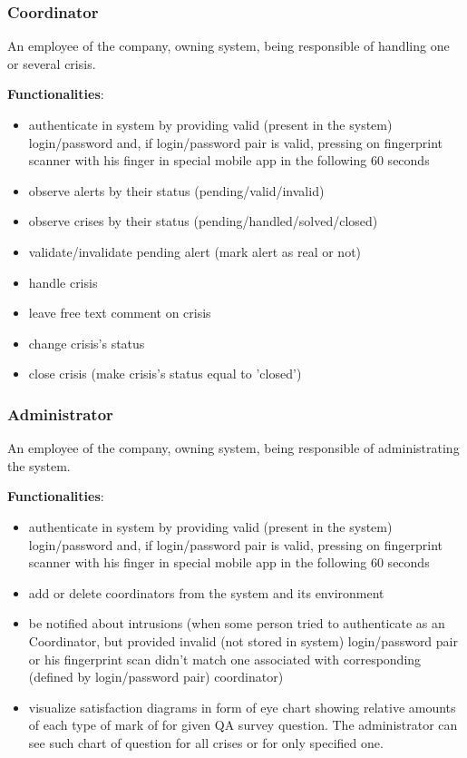 \subsubsection{Coordinator}
An employee of the company, owning \mysystemname system, being responsible of
handling one or several crisis.

\textbf{Functionalities}:

\begin{itemize}
  \item authenticate in \mysystemname system by providing valid (present in the
  system) login/password and, if login/password pair is valid, pressing on
  fingerprint scanner with his finger in special mobile app in the following 60
  seconds
  \item observe alerts by their status (pending/valid/invalid)
  \item observe crises by their status (pending/handled/solved/closed)
  \item validate/invalidate pending alert (mark alert as real or not)
  \item handle crisis
  \item leave free text comment on crisis
  \item change crisis's status
  \item close crisis (make crisis's status equal to 'closed')
\end{itemize}

\subsubsection{Administrator}
An employee of the company, owning \mysystemname system, being responsible of
administrating the system. 

\textbf{Functionalities}:

\begin{itemize}
  \item authenticate in \mysystemname system by providing valid (present in the
  system) login/password and, if login/password pair is valid, pressing on
  fingerprint scanner with his finger in special mobile app in the following 60
  seconds
  \item add or delete coordinators from the system and its environment
  \item be notified about intrusions (when some person tried to authenticate as
  an Coordinator, but provided invalid (not stored in \mysystemname system)
  login/password pair or his fingerprint scan didn't match one associated with
  corresponding (defined by login/password pair) coordinator)
  \item visualize satisfaction diagrams in form of eye chart showing relative
  amounts of each type of mark of for given QA survey question. The
  administrator can see such chart of question for all crises or for only
  specified one.
\end{itemize}


